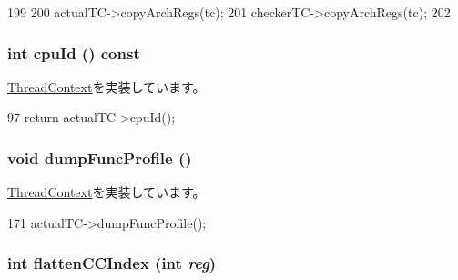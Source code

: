 \begin{DoxyCode}
199     {
200         actualTC->copyArchRegs(tc);
201         checkerTC->copyArchRegs(tc);
202     }
\end{DoxyCode}
\hypertarget{classCheckerThreadContext_a1e2d18ebf4e21f2416c21a8b072e2c7b}{
\subsubsection[{cpuId}]{\setlength{\rightskip}{0pt plus 5cm}int cpuId () const}}
\label{classCheckerThreadContext_a1e2d18ebf4e21f2416c21a8b072e2c7b}


\hyperlink{classThreadContext_a7272bc1f752a9f60ab0358a09cc96f97}{ThreadContext}を実装しています。


\begin{DoxyCode}
97 { return actualTC->cpuId(); }
\end{DoxyCode}
\hypertarget{classCheckerThreadContext_a13fa12d1779a94a1e0b968946a1367c7}{
\subsubsection[{dumpFuncProfile}]{\setlength{\rightskip}{0pt plus 5cm}void dumpFuncProfile ()}}
\label{classCheckerThreadContext_a13fa12d1779a94a1e0b968946a1367c7}


\hyperlink{classThreadContext_ae3f0b63a85470c17e675083487febead}{ThreadContext}を実装しています。


\begin{DoxyCode}
171 { actualTC->dumpFuncProfile(); }
\end{DoxyCode}
\hypertarget{classCheckerThreadContext_ac33d74353e36a595ec48962cd0446320}{
\subsubsection[{flattenCCIndex}]{\setlength{\rightskip}{0pt plus 5cm}int flattenCCIndex (int {\em reg})}}
\label{classCheckerThreadContext_ac33d74353e36a595ec48962cd0446320}


